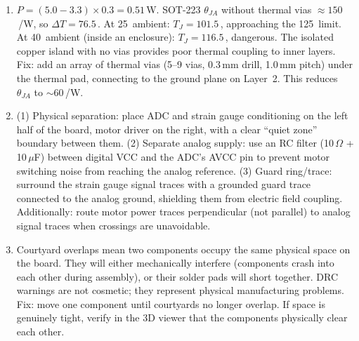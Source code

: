 \begin{enumerate}[leftmargin=1.5em]
\item $P = (5.0 - 3.3) \times 0.3 = 0.51$\,W. SOT-223 $\theta_{JA}$ without thermal vias $\approx 150$\,\degC{}/W, so $\Delta T = 76.5$\,\degC{}. At 25\,\degC{} ambient: $T_J = 101.5$\,\degC{}, approaching the 125\,\degC{} limit. At 40\,\degC{} ambient (inside an enclosure): $T_J = 116.5$\,\degC{}, dangerous. The isolated copper island with no vias provides poor thermal coupling to inner layers. Fix: add an array of thermal vias (5--9 vias, 0.3\,mm drill, 1.0\,mm pitch) under the thermal pad, connecting to the ground plane on Layer~2. This reduces $\theta_{JA}$ to $\sim$60\,\degC{}/W.
\item (1) Physical separation: place ADC and strain gauge conditioning on the left half of the board, motor driver on the right, with a clear ``quiet zone'' boundary between them. (2) Separate analog supply: use an RC filter (10\,$\Omega$ + 10\,$\mu$F) between digital VCC and the ADC's AVCC pin to prevent motor switching noise from reaching the analog reference. (3) Guard ring/trace: surround the strain gauge signal traces with a grounded guard trace connected to the analog ground, shielding them from electric field coupling. Additionally: route motor power traces perpendicular (not parallel) to analog signal traces when crossings are unavoidable.
\item Courtyard overlaps mean two components occupy the same physical space on the board. They will either mechanically interfere (components crash into each other during assembly), or their solder pads will short together. DRC warnings are not cosmetic; they represent physical manufacturing problems. Fix: move one component until courtyards no longer overlap. If space is genuinely tight, verify in the 3D viewer that the components physically clear each other.
\end{enumerate}


